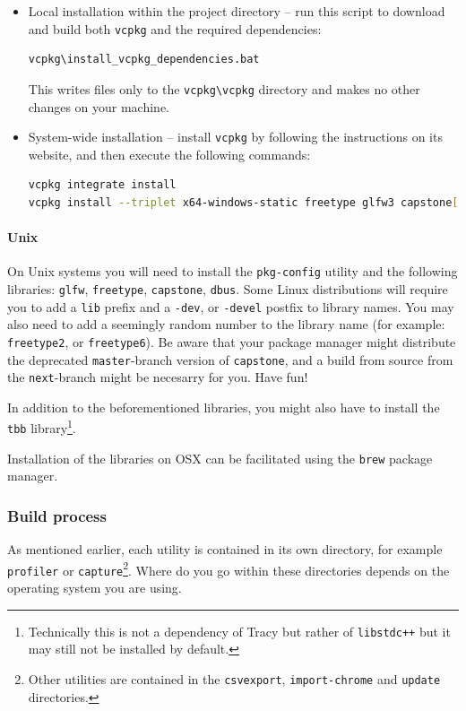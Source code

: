\documentclass[hidelinks,titlepage,a4paper]{article}
\begin{document}
\begin{itemize}
\item Local installation within the project directory -- run this script to download and build both \texttt{vcpkg} and the required dependencies:
\begin{lstlisting}[language=sh]
vcpkg\install_vcpkg_dependencies.bat
\end{lstlisting}
This writes files only to the \texttt{vcpkg\textbackslash{}vcpkg} directory and makes no other changes on your machine.
\item System-wide installation -- install \texttt{vcpkg} by following the instructions on its website, and then execute the following commands:
\begin{lstlisting}[language=sh]
vcpkg integrate install
vcpkg install --triplet x64-windows-static freetype glfw3 capstone[arm,arm64,x86]
\end{lstlisting}
\end{itemize}

\paragraph{Unix}

On Unix systems you will need to install the \texttt{pkg-config} utility and the following libraries: \texttt{glfw}, \texttt{freetype}, \texttt{capstone}, \texttt{dbus}. Some Linux distributions will require you to add a \texttt{lib} prefix and a \texttt{-dev}, or \texttt{-devel} postfix to library names. You may also need to add a seemingly random number to the library name (for example: \texttt{freetype2}, or \texttt{freetype6}). Be aware that your package manager might distribute the deprecated \texttt{master}-branch version of \texttt{capstone}, and a build from source from the \texttt{next}-branch might be necesarry for you. Have fun!

In addition to the beforementioned libraries, you might also have to install the \texttt{tbb} library\footnote{Technically this is not a dependency of Tracy but rather of \texttt{libstdc++} but it may still not be installed by default.}.

Installation of the libraries on OSX can be facilitated using the \texttt{brew} package manager.

\subsubsection{Build process}

As mentioned earlier, each utility is contained in its own directory, for example \texttt{profiler} or \texttt{capture}\footnote{Other utilities are contained in the \texttt{csvexport}, \texttt{import-chrome} and \texttt{update} directories.}. Where do you go within these directories depends on the operating system you are using.
\end{document}
